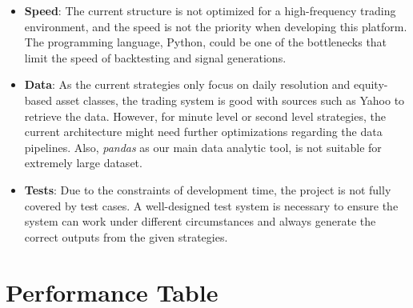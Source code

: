 \documentclass[12pt]{article}
\begin{document}
\begin{itemize}
    \item \textbf{Speed}: The current structure is not optimized for a high-frequency trading environment, and the speed is not the priority when developing this platform. The programming language, Python, could be one of the bottlenecks that limit the speed of backtesting and signal generations.
    \item \textbf{Data}: As the current strategies only focus on daily resolution and equity-based asset classes, the trading system is good with sources such as Yahoo to retrieve the data. However, for minute level or second level strategies, the current architecture might need further optimizations regarding the data pipelines. Also, \textit{pandas} as our main data analytic tool, is not suitable for extremely large dataset.
    \item \textbf{Tests}: Due to the constraints of development time, the project is not fully covered by test cases. A well-designed test system is necessary to ensure the system can work under different circumstances and always generate the correct outputs from the given strategies.
\end{itemize}

\newpage


 
\appendix
\section{Performance Table}
\end{document}

